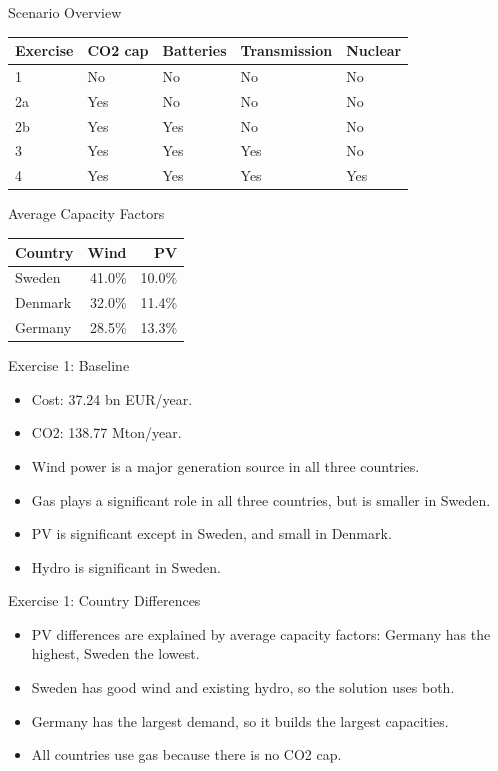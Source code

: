 \documentclass[aspectratio=169]{beamer}
\begin{document}
\begin{frame}{Scenario Overview}
  \begin{table}
    \centering
    \begin{tabular}{lllll}
      \toprule
      Exercise & CO2 cap & Batteries & Transmission & Nuclear \\
      \midrule
      1 & No & No & No & No \\
      2a & Yes & No & No & No \\
      2b & Yes & Yes & No & No \\
      3 & Yes & Yes & Yes & No \\
      4 & Yes & Yes & Yes & Yes \\
      \bottomrule
    \end{tabular}
  \end{table}
\end{frame}

\begin{frame}{Average Capacity Factors}
  \begin{table}
    \centering
    \begin{tabular}{lrr}
      \toprule
      Country & Wind & PV \\
      \midrule
      Sweden & 41.0\% & 10.0\% \\
      Denmark & 32.0\% & 11.4\% \\
      Germany & 28.5\% & 13.3\% \\
      \bottomrule
    \end{tabular}
  \end{table}
\end{frame}

\begin{frame}{Exercise 1: Baseline}
  \begin{itemize}
    \item Cost: 37.24 bn EUR/year.
    \item CO2: 138.77 Mton/year.
    \item Wind power is a major generation source in all three countries.
    \item Gas plays a significant role in all three countries, but is smaller in Sweden.
    \item PV is significant except in Sweden, and small in Denmark.
    \item Hydro is significant in Sweden.
  \end{itemize}
\end{frame}

\begin{frame}{Exercise 1: Country Differences}
  \begin{itemize}
    \item PV differences are explained by average capacity factors: Germany has the highest, Sweden the lowest.
    \item Sweden has good wind and existing hydro, so the solution uses both.
    \item Germany has the largest demand, so it builds the largest capacities.
    \item All countries use gas because there is no CO2 cap.
  \end{itemize}
\end{frame}
\end{document}
